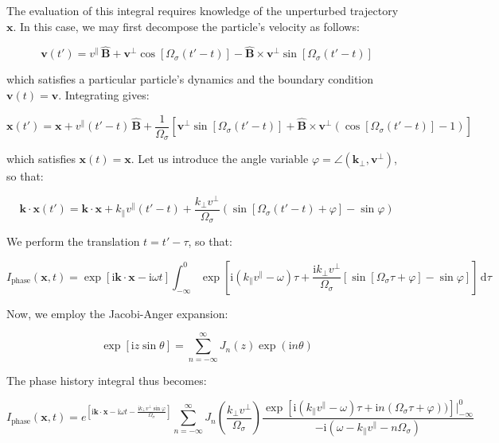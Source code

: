 The evaluation of this integral requires knowledge of the unperturbed trajectory $\mathbf{x}$. In this case, we may first decompose the particle's velocity as follows:

\begin{equation}
    \mathbf{v}(t')=v^\parallel\,\mathbf{\hat{B}}+\mathbf{v}^\perp\cos{[\Omega_\sigma(t'-t)]}-\mathbf{\hat{B}}\times\mathbf{v}^\perp\sin{[\Omega_\sigma(t'-t)]}
\end{equation}

which satisfies a particular particle's dynamics and the boundary condition $\mathbf{v}(t)=\mathbf{v}$. Integrating gives:

\begin{equation}
    \mathbf{x}(t')=\mathbf{x}+v^\parallel(t'-t)\,\mathbf{\hat{B}}+\frac{1}{\Omega_\sigma}\left[\mathbf{v}^\perp\sin{[\Omega_\sigma(t'-t)]}+\mathbf{\hat{B}}\times\mathbf{v}^\perp\left(\cos{[\Omega_\sigma(t'-t)]}-1\right)\right]
\end{equation}

which satisfies $\mathbf{x}(t)=\mathbf{x}$. Let us introduce the angle variable $\varphi=\angle(\mathbf{k}_\perp, \mathbf{v}^\perp)$, so that:

\begin{equation}
    \mathbf{k}\cdot\mathbf{x}(t')=\mathbf{k}\cdot\mathbf{x}+k_\parallel v^\parallel(t'-t)+\frac{k_\perp v^\perp}{\Omega_\sigma}\left(\sin{\left[\Omega_\sigma(t'-t)+\varphi\right]}-\sin{\varphi}\right)
\end{equation}

We perform the translation $t=t'-\tau$, so that:

\begin{equation}
    I_\text{phase}(\mathbf{x},t)=\exp{[\mathrm{i}\mathbf{k}\cdot\mathbf{x}-\mathrm{i}\omega t]}\int_{-\infty}^0\exp{\left[\mathrm{i}(k_\parallel v^\parallel-\omega)\tau+\frac{\mathrm{i}k_\perp v^\perp}{\Omega_\sigma}\left[\sin{[\Omega_\sigma\tau+\varphi]}-\sin{\varphi}\right]\right]}\,\mathrm{d}\tau
\end{equation}

Now, we employ the Jacobi-Anger expansion:

\begin{equation}
    \exp{\left[\mathrm{i}z\sin{\theta}\right]}=\sum_{n=-\infty}^\infty J_n(z)\exp{(\mathrm{i}n\theta)}
\end{equation}

The phase history integral thus becomes:

\begin{equation}
    I_\text{phase}(\mathbf{x},t)=e^{\left[\mathrm{i}\mathbf{k}\cdot\mathbf{x}-\mathrm{i}\omega t -\frac{\mathrm{i}k_\perp v^\perp\sin{\varphi}}{\Omega_\sigma}\right]}\sum_{n=-\infty}^\infty J_n\left(\frac{k_\perp v^\perp}{\Omega_\sigma}\right)\frac{\exp{\left[\mathrm{i}(k_\parallel v^\parallel-\omega)\tau+\mathrm{i}n(\Omega_\sigma\tau+\varphi))\right]\Bigr|_{-\infty}^0}}{-\mathrm{i}(\omega-k_\parallel v^\parallel-n\Omega_\sigma)}
\end{equation}

